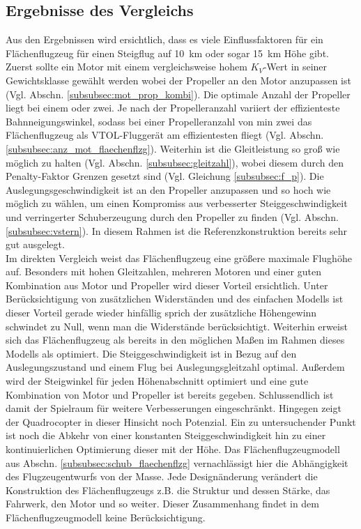 \subsection{Ergebnisse des Vergleichs} 
Aus den Ergebnissen wird ersichtlich, dass es viele Einflussfaktoren für ein Flächenflugzeug für einen Steigflug auf \SI{10}{km} oder sogar \SI{15}{km} Höhe gibt. Zuerst sollte ein Motor mit einem vergleichsweise hohem \ensuremath{K_V}-Wert in seiner Gewichtsklasse gewählt werden wobei der Propeller an den Motor anzupassen ist (Vgl. Abschn. \ref{subsubsec:mot_prop_kombi}). Die optimale Anzahl der Propeller liegt bei einem oder zwei. Je nach der Propelleranzahl variiert der effizienteste Bahnneigungswinkel, sodass bei einer Propelleranzahl von min zwei das Flächenflugzeug als VTOL-Fluggerät am effizientesten fliegt (Vgl. Abschn. \ref{subsubsec:anz_mot_flaechenflzg}). Weiterhin ist die Gleitleistung so groß wie möglich zu halten (Vgl. Abschn. \ref{subsubsec:gleitzahl}), wobei diesem durch den Penalty-Faktor Grenzen gesetzt sind (Vgl. Gleichung \ref{subsubsec:f_p}). Die Auslegungsgeschwindigkeit ist an den Propeller anzupassen und so hoch wie möglich zu wählen, um einen Kompromiss aus verbesserter Steiggeschwindigkeit und verringerter Schuberzeugung durch den Propeller zu finden (Vgl. Abschn. \ref{subsubsec:vstern}). In diesem Rahmen ist die Referenzkonstruktion bereits sehr gut ausgelegt.\\
Im direkten Vergleich weist das Flächenflugzeug eine größere maximale Flughöhe auf. Besonders mit hohen Gleitzahlen, mehreren Motoren und einer guten Kombination aus Motor und Propeller wird dieser Vorteil ersichtlich. Unter Berücksichtigung von zusätzlichen Widerständen und des einfachen Modells ist dieser Vorteil gerade wieder hinfällig sprich der zusätzliche Höhengewinn schwindet zu Null, wenn man die Widerstände berücksichtigt. Weiterhin erweist sich das Flächenflugzeug als bereits in den möglichen Maßen im Rahmen dieses Modells als optimiert. Die Steiggeschwindigkeit ist in Bezug auf den Auslegungszustand und einem Flug bei Auslegungsgleitzahl optimal. Außerdem wird der Steigwinkel für jeden Höhenabschnitt optimiert und eine gute Kombination von Motor und Propeller ist bereits gegeben. Schlussendlich ist damit der Spielraum für weitere Verbesserungen eingeschränkt. Hingegen zeigt der Quadrocopter in dieser Hinsicht noch Potenzial. Ein zu untersuchender Punkt ist noch die Abkehr von einer konstanten Steiggeschwindigkeit hin zu einer kontinuierlichen Optimierung dieser mit der Höhe. Das Flächenflugzeugmodell aus Abschn. \ref{subsubsec:schub_flaechenflzg} vernachlässigt hier die Abhängigkeit des Flugzeugentwurfs von der Masse. Jede Designänderung verändert die Konstruktion des Flächenflugzeugs z.B. die Struktur und dessen Stärke, das Fahrwerk, den Motor und so weiter. Dieser Zusammenhang findet in dem Flächenflugzeugmodell keine Berücksichtigung. \\
